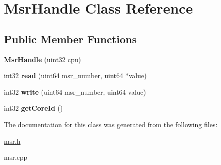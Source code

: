 \hypertarget{class_msr_handle}{}\section{Msr\+Handle Class Reference}
\label{class_msr_handle}
\subsection*{Public Member Functions}
\begin{DoxyCompactItemize}
\item 
\mbox{\label{class_msr_handle_a481b0c81ad8f00d9d69db660e793a135}} 
{\bfseries Msr\+Handle} (uint32 cpu)
\item 
\mbox{\label{class_msr_handle_a9a7723baaa1ec91a8303b5ef6579c1df}} 
int32 {\bfseries read} (uint64 msr\+\_\+number, uint64 $\ast$value)
\item 
\mbox{\label{class_msr_handle_aa92da3c093ca1473eb7a7cad86f24c89}} 
int32 {\bfseries write} (uint64 msr\+\_\+number, uint64 value)
\item 
\mbox{\label{class_msr_handle_adbbfac37adfdd3fb571b5a6978f60419}} 
int32 {\bfseries get\+Core\+Id} ()
\end{DoxyCompactItemize}


The documentation for this class was generated from the following files\+:\begin{DoxyCompactItemize}
\item 
\mbox{\hyperlink{msr_8h}{msr.\+h}}\item 
msr.\+cpp\end{DoxyCompactItemize}
